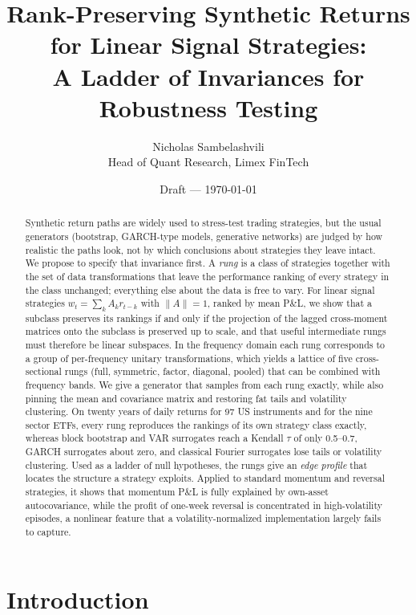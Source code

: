 \documentclass[11pt]{article}
\title{Rank-Preserving Synthetic Returns for Linear Signal Strategies:\\
A Ladder of Invariances for Robustness Testing}
\author{Nicholas Sambelashvili\\
\small Head of Quant Research, Limex FinTech}
\date{\small Draft --- \today}
\theoremstyle{definition}
\theoremstyle{remark}
\begin{document}
\maketitle

\begin{abstract}
Synthetic return paths are widely used to stress-test trading strategies, but the usual generators
(bootstrap, GARCH-type models, generative networks) are judged by how realistic the paths look, not
by which conclusions about strategies they leave intact. We propose to specify that invariance first.
A \emph{rung} is a class of strategies together with the set of data transformations that leave the
performance ranking of every strategy in the class unchanged; everything else about the data is free to vary.
For linear signal strategies $w_t=\sum_k A_k r_{t-k}$ with $\|A\|=1$, ranked by mean P\&L, we show that a subclass
preserves its rankings if and only if the projection of the lagged cross-moment matrices onto the subclass is
preserved up to scale, and that useful intermediate rungs must therefore be linear subspaces. In the frequency domain
each rung corresponds to a group of per-frequency unitary transformations, which yields a lattice of five
cross-sectional rungs (full, symmetric, factor, diagonal, pooled) that can be combined with frequency bands.
We give a generator that samples from each rung exactly, while also pinning the mean and covariance matrix and
restoring fat tails and volatility clustering. On twenty years of daily returns for 97 US instruments and for the
nine sector ETFs, every rung reproduces the rankings of its own strategy class exactly, whereas block bootstrap and
VAR surrogates reach a Kendall $\tau$ of only 0.5--0.7, GARCH surrogates about zero, and classical Fourier surrogates lose tails or volatility clustering.
Used as a ladder of null hypotheses, the rungs give an \emph{edge profile} that locates the structure a strategy
exploits. Applied to standard momentum and reversal strategies, it shows that momentum P\&L is fully explained by
own-asset autocovariance, while the profit of one-week reversal is concentrated in high-volatility episodes, a
nonlinear feature that a volatility-normalized implementation largely fails to capture.
\end{abstract}

\section{Introduction}
\label{sec:intro}
\end{document}
